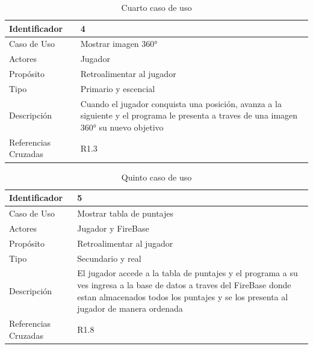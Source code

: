 \begin{table}[H]
    \begin{center}
        \begin{tabular}{| l | m{12cm} |}        
        	\hline 
        	Identificador & 4\\
        	\hline
        	Caso de Uso & Mostrar imagen 360°\\
        	\hline
        	Actores & Jugador\\
        	\hline
        	Propósito & Retroalimentar al jugador \\
        	\hline
        	Tipo & Primario y escencial\\
        	\hline
        	Descripción & Cuando el jugador conquista una posición, avanza a la siguiente y el programa le presenta a traves de una imagen 360° su nuevo objetivo\\
        	\hline
        	Referencias Cruzadas & R1.3\\
        	\hline
        \end{tabular}
    \caption{Cuarto caso de uso}
    \end{center}
\end{table}

\begin{table}[H]
    \begin{center}
        \begin{tabular}{| l | m{12cm} |}        
        	\hline 
        	Identificador & 5\\
        	\hline
        	Caso de Uso & Mostrar tabla de puntajes\\
        	\hline
        	Actores & Jugador y FireBase\\
        	\hline
        	Propósito & Retroalimentar al jugador\\
        	\hline
        	Tipo & Secundario y real\\
        	\hline
        	Descripción & El jugador accede a la tabla de puntajes y el programa a su ves ingresa a la base de datos a traves del FireBase donde estan almacenados todos los puntajes y se los presenta al jugador de manera ordenada\\
        	\hline
        	Referencias Cruzadas & R1.8\\
        	\hline
        \end{tabular}
    \caption{Quinto caso de uso}
    \end{center}
\end{table}


